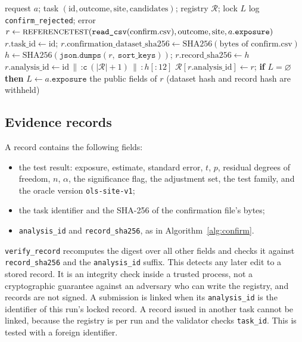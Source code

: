 \begin{algorithm}[h]
\caption{Trusted one-shot confirmation (\texttt{Harness.confirm} and \texttt{oracle.evidence\_record})}
\label{alg:confirm}
\begin{algorithmic}[1]
\Require request $a$; task $(\text{id},\text{outcome},\text{site},\text{candidates})$; registry $\mathcal{R}$; lock $L$
  \State log \texttt{confirm\_rejected}; \Return error
\EndIf
\State $r\gets \fld{ReferenceTest}(\texttt{read\_csv}(\text{confirm.csv}), \text{outcome}, \text{site}, a.\texttt{exposure})$
\State $r.\text{task\_id}\gets\text{id}$; $r.\text{confirmation\_dataset\_sha256}\gets \mathrm{SHA256}(\text{bytes of confirm.csv})$
\State $h\gets\mathrm{SHA256}(\texttt{json.dumps}(r,\ \texttt{sort\_keys}))$; $r.\text{record\_sha256}\gets h$
\State $r.\text{analysis\_id}\gets \text{id}\,\|\,\texttt{:c}\,(|\mathcal{R}|{+}1)\,\|\,\texttt{:}\,h[{:}12]$
\State $\mathcal{R}[r.\text{analysis\_id}]\gets r$; \textbf{if} $L=\varnothing$ \textbf{then} $L\gets a.\texttt{exposure}$
\State \Return the public fields of $r$ (dataset hash and record hash are withheld)
\end{algorithmic}
\end{algorithm}

\subsection{Evidence records}
\label{app:trusted-records}
A record contains the following fields:
\begin{itemize}
\item the test result: exposure, estimate, standard error, $t$, $p$,
residual degrees of freedom, $n$, $\alpha$, the significance flag, the
adjustment set, the test family, and the oracle version
\texttt{ols-site-v1};
\item the task identifier and the SHA-256 of the confirmation file's bytes;
\item \texttt{analysis\_id} and \texttt{record\_sha256}, as in
Algorithm~\ref{alg:confirm}.
\end{itemize}
\texttt{verify\_record} recomputes the digest over all other fields and checks
it against \texttt{record\_sha256} and the \texttt{analysis\_id} suffix. This
detects any later edit to a stored record. It is an integrity check inside a
trusted process, not a cryptographic guarantee against an adversary who can
write the registry, and records are not signed. A submission is linked when
its \texttt{analysis\_id} is the identifier of this run's locked record. A
record issued in another task cannot be linked, because the registry is per
run and the validator checks \texttt{task\_id}. This is tested with a foreign
identifier.

